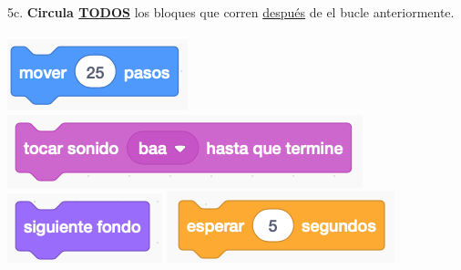 \documentclass[letterpaper,12pt]{article}
\begin{document}
\noindent 5c. \textbf{Circula \underline{TODOS}} los bloques que corren \underline{después} de el bucle anteriormente.  \\ \\
\includegraphics[scale=.8]{q5_script1.png} \hspace{1cm}
\includegraphics[scale=.8]{q5_script2.png} \hspace{1cm}
\includegraphics[scale=.8]{q5_script3.png} \hspace{1cm}
\includegraphics[scale=.8]{q5_script4.png} \hspace{1cm}\\

\noindent \dotfill \\

\newpage
\end{document}
